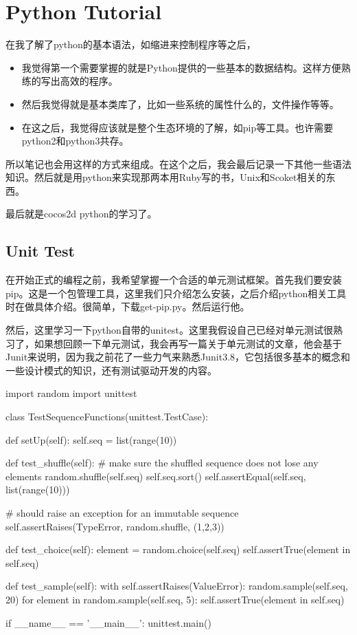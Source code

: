 \chapter{Python Tutorial}
在我了解了python的基本语法，如缩进来控制程序等之后，
\begin{itemize}
\item 我觉得第一个需要掌握的就是Python提供的一些基本的数据结构。这样方便熟练的写出高效的程序。
\item 然后我觉得就是基本类库了，比如一些系统的属性什么的，文件操作等等。
\item 在这之后，我觉得应该就是整个生态环境的了解，如pip等工具。也许需要python2和python3共存。
\end{itemize}
所以笔记也会用这样的方式来组成。在这个之后，我会最后记录一下其他一些语法知识。然后就是用python来实现那两本用Ruby写的书，Unix和Scoket相关的东西。

最后就是cocos2d python的学习了。
\section{Unit Test}
在开始正式的编程之前，我希望掌握一个合适的单元测试框架。首先我们要安装pip。这是一个包管理工具，这里我们只介绍怎么安装，之后介绍python相关工具时在做具体介绍。很简单，下载get-pip.py。然后运行他。

然后，这里学习一下python自带的unitest。这里我假设自己已经对单元测试很熟习了，如果想回顾一下单元测试，我会再写一篇关于单元测试的文章，他会基于Junit来说明，因为我之前花了一些力气来熟悉Junit3.8，它包括很多基本的概念和一些设计模式的知识，还有测试驱动开发的内容。

\begin{Python}
import random
import unittest

class TestSequenceFunctions(unittest.TestCase):

    def setUp(self):
        self.seq = list(range(10))

    def test_shuffle(self):
        # make sure the shuffled sequence does not lose any elements
        random.shuffle(self.seq)
        self.seq.sort()
        self.assertEqual(self.seq, list(range(10)))

        # should raise an exception for an immutable sequence
        self.assertRaises(TypeError, random.shuffle, (1,2,3))

    def test_choice(self):
        element = random.choice(self.seq)
        self.assertTrue(element in self.seq)

    def test_sample(self):
        with self.assertRaises(ValueError):
            random.sample(self.seq, 20)
        for element in random.sample(self.seq, 5):
            self.assertTrue(element in self.seq)

if __name__ == '__main__':
    unittest.main()
\end{Python}


